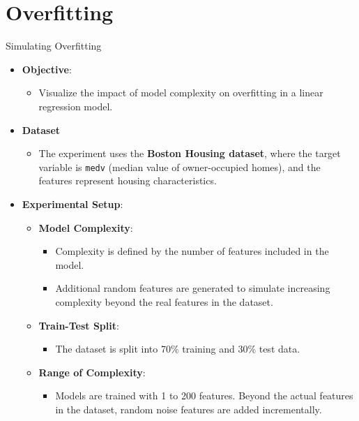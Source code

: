 \documentclass[
  ignorenonframetext,
]{beamer}
\providecommand{\tightlist}{%
  \setlength{\itemsep}{0pt}\setlength{\parskip}{0pt}}\usepackage{longtable,booktabs,array}
\begin{document}
\section{Overfitting}\label{overfitting}

\begin{frame}[fragile]{Simulating Overfitting}
\label{simulating-overfitting}
\begin{itemize}
\tightlist
\item
  \textbf{Objective}:

  \begin{itemize}
  \tightlist
  \item
    Visualize the impact of model complexity on overfitting in a linear
    regression model.
  \end{itemize}
\item
  \textbf{Dataset}

  \begin{itemize}
  \tightlist
  \item
    The experiment uses the \textbf{Boston Housing dataset}, where the
    target variable is \texttt{medv} (median value of owner-occupied
    homes), and the features represent housing characteristics.
  \end{itemize}
\end{itemize}
\end{frame}

\begin{frame}
\begin{itemize}
\tightlist
\item
  \textbf{Experimental Setup}:

  \begin{itemize}
  \tightlist
  \item
    \textbf{Model Complexity}:

    \begin{itemize}
    \tightlist
    \item
      Complexity is defined by the number of features included in the
      model.
    \item
      Additional random features are generated to simulate increasing
      complexity beyond the real features in the dataset.
    \end{itemize}
  \item
    \textbf{Train-Test Split}:

    \begin{itemize}
    \tightlist
    \item
      The dataset is split into 70\% training and 30\% test data.
    \end{itemize}
  \item
    \textbf{Range of Complexity}:

    \begin{itemize}
    \tightlist
    \item
      Models are trained with 1 to 200 features. Beyond the actual
      features in the dataset, random noise features are added
      incrementally.
    \end{itemize}
  \end{itemize}
\end{itemize}
\end{frame}
\end{document}
